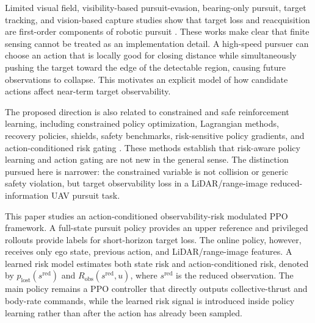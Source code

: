 \documentclass[lettersize,journal]{IEEEtran}
\begin{document}
Limited visual field, visibility-based pursuit-evasion, bearing-only pursuit, target tracking, and vision-based capture studies show that target loss and reacquisition are first-order components of robotic pursuit \cite{peng2025limitedvisual,wang2025viper,zhou2025visibilityocclusion,li2025bearingonly,mavcapturingmav2024,cao2019droneschasing,zhang2019coarsetofine,park2023lidardrone}. These works make clear that finite sensing cannot be treated as an implementation detail. A high-speed pursuer can choose an action that is locally good for closing distance while simultaneously pushing the target toward the edge of the detectable region, causing future observations to collapse. This motivates an explicit model of how candidate actions affect near-term target observability.

The proposed direction is also related to constrained and safe reinforcement learning, including constrained policy optimization, Lagrangian methods, recovery policies, shields, safety benchmarks, risk-sensitive policy gradients, and action-conditioned risk gating \cite{achiam2017cpo,stooke2020pidlag,thananjeyan2021recoveryrl,alshiekh2018shielding,safetygym2019,kim2024predictivecvar,liu2026actionriskgating}. These methods establish that risk-aware policy learning and action gating are not new in the general sense. The distinction pursued here is narrower: the constrained variable is not collision or generic safety violation, but target observability loss in a LiDAR/range-image reduced-information UAV pursuit task.

This paper studies an action-conditioned observability-risk modulated PPO framework. A full-state pursuit policy provides an upper reference and privileged rollouts provide labels for short-horizon target loss. The online policy, however, receives only ego state, previous action, and LiDAR/range-image features. A learned risk model estimates both state risk and action-conditioned risk, denoted by $p_{\mathrm{lost}}(s^{\mathrm{red}})$ and $R_{\mathrm{obs}}(s^{\mathrm{red}},u)$, where $s^{\mathrm{red}}$ is the reduced observation. The main policy remains a PPO controller that directly outputs collective-thrust and body-rate commands, while the learned risk signal is introduced inside policy learning rather than after the action has already been sampled.
\end{document}
